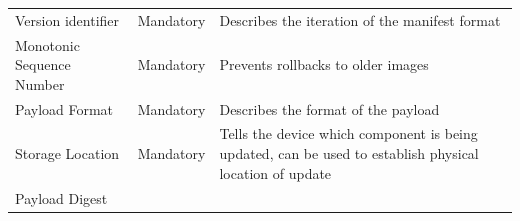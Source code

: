 \documentclass[0-thesis.tex]{subfiles}
\begin{document}
\begin{small}
\begin{longtable}[]{@{}lll@{}}
    \begin{minipage}[t]{0.23\columnwidth}\raggedright\strut
    Version identifier\strut
    \end{minipage} & \begin{minipage}[t]{0.26\columnwidth}\raggedright\strut
    Mandatory\strut
    \end{minipage} & \begin{minipage}[t]{0.42\columnwidth}\raggedright\strut
    Describes the iteration of the manifest format\strut
    \end{minipage}\tabularnewline
    \begin{minipage}[t]{0.23\columnwidth}\raggedright\strut
    Monotonic Sequence Number\strut
    \end{minipage} & \begin{minipage}[t]{0.26\columnwidth}\raggedright\strut
    Mandatory\strut
    \end{minipage} & \begin{minipage}[t]{0.42\columnwidth}\raggedright\strut
    Prevents rollbacks to older images\strut
    \end{minipage}\tabularnewline
    \begin{minipage}[t]{0.23\columnwidth}\raggedright\strut
    Payload Format\strut
    \end{minipage} & \begin{minipage}[t]{0.26\columnwidth}\raggedright\strut
    Mandatory\strut
    \end{minipage} & \begin{minipage}[t]{0.42\columnwidth}\raggedright\strut
    Describes the format of the payload\strut
    \end{minipage}\tabularnewline
    \begin{minipage}[t]{0.23\columnwidth}\raggedright\strut
    Storage Location\strut
    \end{minipage} & \begin{minipage}[t]{0.26\columnwidth}\raggedright\strut
    Mandatory\strut
    \end{minipage} & \begin{minipage}[t]{0.42\columnwidth}\raggedright\strut
    Tells the device which component is being updated, can be used to
    establish physical location of update\strut
    \end{minipage}\tabularnewline
    \begin{minipage}[t]{0.23\columnwidth}\raggedright\strut
    Payload Digest\strut
    \end{minipage} & \begin{minipage}[t]{0.26\columnwidth}\raggedright\strut

\end{minipage}
\end{longtable}
\end{small}
\end{document}
